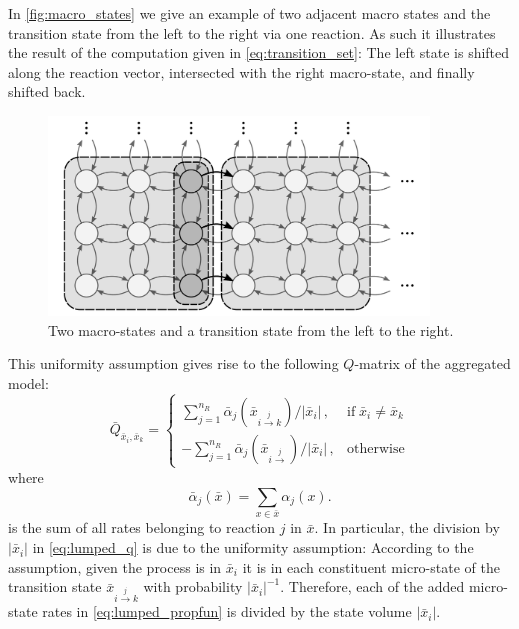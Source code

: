 \begin{example}
In \autoref{fig:macro_states}
we give an example of two adjacent macro states and the
transition state from the left to the right via one reaction.
As such it illustrates the result of the computation given in \eqref{eq:transition_set}:
The left state is shifted along the reaction vector, intersected with the right macro-state, and finally shifted back.
\begin{figure}[htb]
	\centering
	\includegraphics[width=0.9\textwidth]{gfx/macro_states.pdf}
	\caption[Macro-state transition]{\label{fig:macro_states}Two macro-states and a transition state from the left to the right.}
\end{figure}
\end{example}

This uniformity assumption gives rise to the following $Q$-matrix of the aggregated model:
\begin{equation}\label{eq:lumped_q}
    \bar{Q}_{ \bar{x}_i,  \bar{x}_k} = \begin{cases}
        \sum_{j=1}^{n_R}{\bar\alpha}_j\left(\bar{x}_{i\xrightarrow{j}k}\right)/\left|\bar{x}_i\right|\,,&\text{if}\; \bar{x}_i\neq \bar{x}_k\\[1ex]
        -\sum_{j=1}^{n_R}{\bar\alpha}_j\left(\bar{x}_{i\xrightarrow{j}}\right)/{\left|\bar{x}_i\right|}\,, &\text{otherwise}
    \end{cases}
\end{equation}
where 
\begin{equation}\label{eq:lumped_propfun}
    \bar{\alpha}_j({\bar{x}}) = \sum_{x\in \bar{x}} \alpha_j(x).
\end{equation}
is the sum of all rates belonging to reaction $j$ in $\bar{x}$.
In particular, the division by $\left|\bar{x}_i\right|$ in \eqref{eq:lumped_q} is due to the uniformity assumption: According to the assumption, given the process is in $\bar{x}_i$ it is in
each constituent micro-state of the transition state $\bar{x}_{i\xrightarrow{j} k}$ with probability ${\left|\bar{x}_i\right|}^{-1}$.
Therefore, each of the added micro-state rates in \eqref{eq:lumped_propfun} is divided
by the state volume $\left|\bar{x}_i\right|$.

